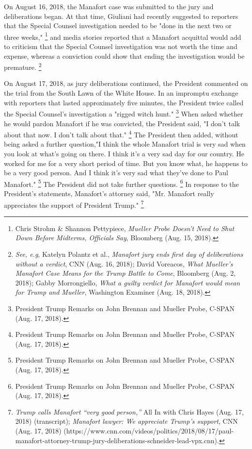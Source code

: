 {On August 16, 2018, the Manafort case was submitted to the jury and deliberations began.
At that time, Giuliani had recently suggested to reporters that the Special Counsel investigation needed to be "done in the next two or three weeks,"%
\footnote{Chris Strohm \& Shannon Pettypiece, \textit{Mueller Probe Doesn’t Need to Shut Down Before Midterms, Officials Say}, Bloomberg (Aug. 15, 2018).}
and media stories reported that a Manafort acquittal would add to criticism that the Special Counsel investigation was not worth the time and expense, whereas a conviction could show that ending the investigation would be premature.%
\footnote{\textit{See, e.g}, Katelyn Polantz et al., \textit{Manafort jury ends first day of deliberations without a verdict}, CNN (Aug. 16, 2018);
David Voreacos, \textit{What Mueller’s Manafort Case Means for the Trump Battle to Come}, Bloomberg (Aug. 2, 2018);
Gabby Morrongiello, \textit{What a guilty verdict for Manafort would mean for Trump and Mueller}, Washington Examiner (Aug. 18, 2018).}

On August 17, 2018, as jury deliberations continued, the President commented on the trial from the South Lawn of the White House.
In an impromptu exchange with reporters that lasted approximately five minutes, the President twice called the Special Counsel's investigation a "rigged witch hunt."%
\footnote{President Trump Remarks on John Brennan and Mueller Probe, C-SPAN (Aug. 17, 2018).}
When asked whether he would pardon Manafort if he was convicted, the President said, "I don't talk about that now.
I don't talk about that."%
\footnote{President Trump Remarks on John Brennan and Mueller Probe, C-SPAN (Aug. 17, 2018).}
The President then added, without being asked a further question,"I think the whole Manafort trial is very sad when you look at what's going on there.
I think it's a very sad day for our country.
He worked for me for a very short period of time.
But you know what, he happens to be a very good person.
And I think it's very sad what they've done to Paul Manafort."%
\footnote{President Trump Remarks on John Brennan and Mueller Probe, C-SPAN (Aug. 17, 2018).}
The President did not take further questions.%
\footnote{President Trump Remarks on John Brennan and Mueller Probe, C-SPAN (Aug. 17, 2018).}
In response to the President's statements, Manafort's attorney said, "Mr. Manafort really appreciates the support of President Trump."%
\footnote{\textit{Trump calls Manafort “very good person,”} All In with Chris Hayes (Aug. 17, 2018) (transcript);
\textit{Manafort lawyer: We appreciate Trump’s support}, CNN (Aug. 17, 2018) (https://www.cnn.com/videos/politics/2018/08/17/paul-manafort-attorney-trump-jury-deliberations-schneider-lead-vpx.cnn).}

}
